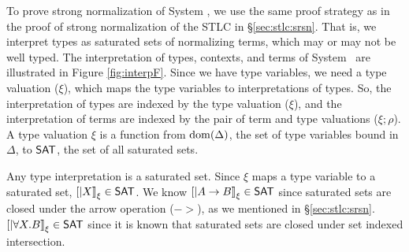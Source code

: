 To prove strong normalization of System \F, we use the same proof strategy
as in the proof of strong normalization of the STLC in \S\ref{sec:stlc:srsn}.
That is, we interpret types as saturated sets of normalizing terms, which
may or may not be well typed. The interpretation of types, contexts, and
terms of System \F\ are illustrated in Figure \ref{fig:interpF}. Since we
have type variables, we need a type valuation ($\xi$), which maps
the type variables to interpretations of types. So, the interpretation of types
are indexed by the type valuation ($\xi$), and the interpretation of terms are
indexed by the pair of term and type valuations ($\xi;\rho$). A type valuation
$\xi$ is a function from $\mathop{\mathrm{dom}}(\Delta)$, the set of type variables bound in
$\Delta$, to $\mathsf{SAT}$, the set of all saturated sets.

Any type interpretation is a saturated set. Since $\xi$ maps a type variable
to a saturated set, $[|X|]_\xi \in \mathsf{SAT}$. We know $[|A -> B|]_\xi \in \mathsf{SAT}$
since saturated sets are closed under the arrow operation ($->$), as we
mentioned in \S\ref{sec:stlc:srsn}. $[|\forall X.B|]_\xi \in \mathsf{SAT}$ since
it is known that saturated sets are closed under set indexed intersection.

